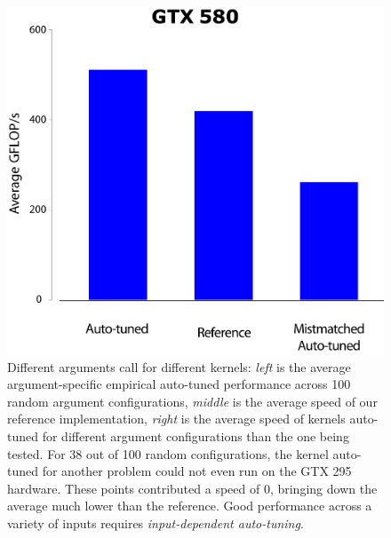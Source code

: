\documentclass{sig-alternate}
\begin{document}
\begin{figure}[!t]
\centering
\includegraphics[width=\linewidth]{illustrator/fig_allstars_mixup_580_R2.pdf}
\caption{Different arguments call for different kernels:
{\em left} is the average argument-specific empirical
auto-tuned performance across 100 random argument configurations,
{\em middle} is the average speed of our reference implementation,
{\em right} is the average speed of kernels auto-tuned for different argument
configurations than the one being tested.  For 38 out of 100 random configurations, the
kernel auto-tuned for another problem could not even run on the GTX 295
hardware.  These points contributed a speed of 0, bringing down the average
much lower than the reference.  Good performance across a variety of inputs
requires {\em input-dependent auto-tuning}.
}
\label{fig:allstars}
\end{figure}
\end{document}
